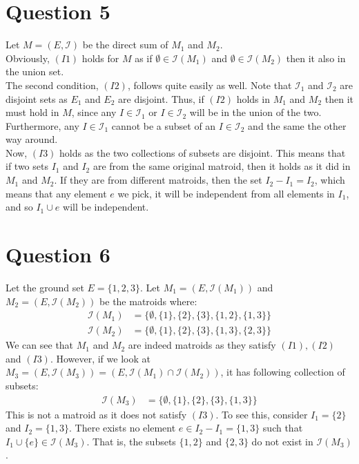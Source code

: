 \documentclass[a4paper, fleqn]{article}
\begin{document}
\section*{Question 5}
Let $M=(E,\mathcal{I})$ be the direct sum of $M_1$ and $M_2$. \\
Obviously, $(I1)$ holds for $M$ as if $\emptyset\in \mathcal{I}(M_1)$ and $\emptyset\in \mathcal{I}(M_2)$ then it also in the union set. \\
The second condition, $(I2)$, follows quite easily as well. Note that $\mathcal{I}_1$ and $\mathcal{I}_2$ are disjoint sets as $E_1$ and $E_2$ are disjoint. Thus, if $(I2)$ holds in $M_1$ and $M_2$ then it must hold in $M$, since any $I\in \mathcal{I}_1$ or $I\in \mathcal{I}_2$ will be in the union of the two. Furthermore, any $I\in \mathcal{I}_1$ cannot be a subset of an $I\in \mathcal{I}_2$ and the same the other way around. \\
Now, $(I3)$ holds as the two collections of subsets are disjoint. This means that if two sets $I_1$ and $I_2$ are from the same original matroid, then it holds as it did in $M_1$ and $M_2$. If they are from different matroids, then the set $I_2-I_1=I_2$, which means that any element $e$ we pick, it will be independent from all elements in $I_1$, and so $I_1\cup e$ will be independent.

\section*{Question 6}
Let the ground set $E=\{1,2,3\}$. Let $M_1=(E, \mathcal{I}(M_1))$ and $M_2=(E, \mathcal{I}(M_2))$ be the matroids where:
\begin{align*}
  \mathcal{I}(M_1)&=\{\emptyset, \{1\}, \{2\}, \{3\}, \{1,2\}, \{1,3\}\} \\
  \mathcal{I}(M_2)&=\{\emptyset, \{1\}, \{2\}, \{3\}, \{1,3\}, \{2,3\}\}
\end{align*}
We can see that $M_1$ and $M_2$ are indeed matroids as they satisfy $(I1),(I2)$ and $(I3)$. However, if we look at $M_3=(E, \mathcal{I}(M_3))=(E, \mathcal{I}(M_1)\cap \mathcal{I}(M_2))$, it has following collection of subsets:
\begin{align*}
  \mathcal{I}(M_3)&=\{\emptyset, \{1\}, \{2\}, \{3\}, \{1,3\}\}
\end{align*}
This is not a matroid as it does not satisfy $(I3)$. To see this, consider $I_1=\{2\}$ and $I_2=\{1,3\}$. There exists no element $e\in I_2-I_1=\{1,3\}$ such that $I_1\cup \{e\}\in \mathcal{I}(M_3)$. That is, the subsets $\{1,2\}$ and $\{2,3\}$ do not exist in $\mathcal{I}(M_3)$.
\end{document}
